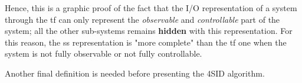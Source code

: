 \begin{remark}
\begin{figure}[H]
    \end{figure}
    
    \vspace{-15pt}
    
    Hence, this is a graphic proof of the fact that the I/O representation of a system through the \acrlong{tf} can only represent the \emph{observable} and \emph{controllable} part of the system; all the other sub-systems remains \textbf{hidden} with this representation. For this reason, the \gls{ss} representation is "more complete" than the \gls{tf} one when the system is not fully observable or not fully controllable.
\end{remark}

Another final definition is needed before presenting the 4SID algorithm.

